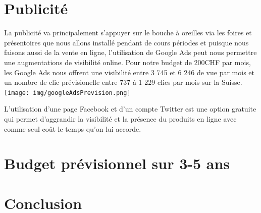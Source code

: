 \documentclass{article}
\begin{document}
\section{Publicité}
La publicité va principalement s'appuyer sur le bouche à oreilles via les foires et présentoires que nous allons installé pendant de cours périodes et puisque nous faisons aussi de la vente en ligne, l'utilisation de Google Ads peut nous permettre une augmentations de visibilité online. Pour notre budget de 200CHF par mois, les Google Ads nous offrent une visibilité entre 3 745 et 6 246 de vue par mois et un nombre de clic prévisionelle entre 737 à 1 229 clics par mois sur la Suisse. 
\texttt{[image: img/googleAdsPrevision.png]} 

L'utilisation d'une page Facebook et d'un compte Twitter est une option gratuite qui permet d'aggrandir la visibilité et la présence du produits en ligne avec comme seul coût le temps qu'on lui accorde. 

\section{Budget prévisionnel sur 3-5 ans}

\section{Conclusion}



\end{document}
